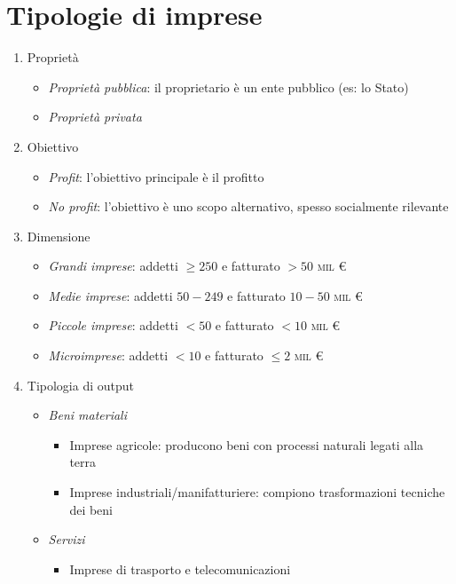 \section{Tipologie di imprese}
\begin{enumerate}
    \item Proprietà
    \begin{itemize}
        \item \emph{Proprietà pubblica}: il proprietario è un ente pubblico
        (es: lo Stato)
        \item \emph{Proprietà privata}
    \end{itemize}
    \item Obiettivo
    \begin{itemize}
        \item \emph{Profit}: l’obiettivo principale è il profitto
        \item \emph{No profit}: l’obiettivo è uno scopo alternativo, spesso
        socialmente rilevante
    \end{itemize}
    \item Dimensione
    \begin{itemize}
        \item \emph{Grandi imprese}: addetti $\ge 250$ e fatturato $> 50$ \textsc{mil} \euro
        \item \emph{Medie imprese}: addetti $50-249$ e fatturato $10-50$ \textsc{mil} \euro
        \item \emph{Piccole imprese}: addetti $< 50$ e fatturato $< 10$ \textsc{mil} \euro
        \item \emph{Microimprese}: addetti $< 10$ e fatturato $\le 2$ \textsc{mil} \euro
    \end{itemize}
    \item Tipologia di output
    \begin{itemize}
        \item \emph{Beni materiali}
        \begin{itemize}
            \item Imprese agricole: producono beni con processi naturali legati 
            alla terra
            \item Imprese industriali/manifatturiere: compiono trasformazioni
            tecniche dei beni
        \end{itemize}
        \item \emph{Servizi}
        \begin{itemize}
            \item Imprese di trasporto e telecomunicazioni

\end{itemize}
\end{itemize}
\end{enumerate}
